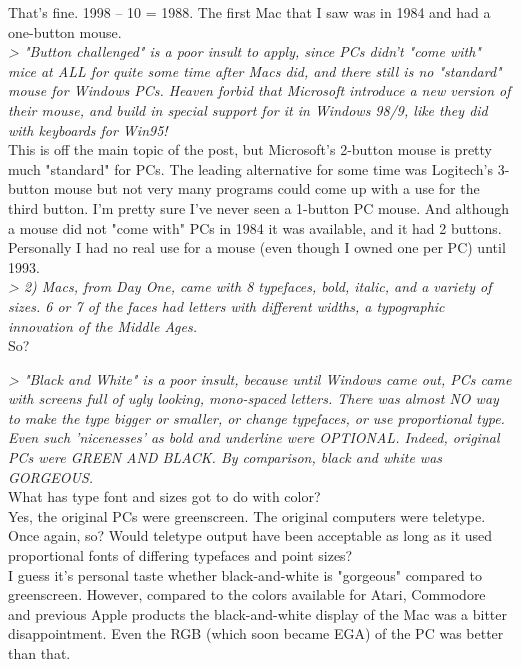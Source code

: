 \documentclass[11pt,twoside,a4paper]{article}
\begin{document}
\begin{multicols*}{2}
That's fine.  1998 -- 10 = 1988.  The first Mac that I saw was in 1984 and had a one-button mouse. ~\\

\emph{> "Button challenged" is a poor insult to apply, since PCs didn't "come with" mice at ALL for quite some time after Macs did, and there still is no "standard" mouse for Windows PCs. Heaven forbid that Microsoft introduce a new version of their mouse, and build in special support for it in Windows 98/9, like they did with keyboards for Win95!} ~\\

This is off the main topic of the post, but Microsoft's 2-button mouse is pretty much "standard" for PCs.  The leading alternative for some time was Logitech's 3-button mouse but not very many programs could come up with a use for the third button.  I'm pretty sure I've never seen a 1-button PC mouse.  And although a mouse did not "come with" PCs in 1984 it was available, and it had 2 buttons.  Personally I had no real use for a mouse (even though I owned one per PC) until 1993. ~\\

\emph{> 2) Macs, from Day One, came with 8 typefaces, bold, italic, and a variety of sizes. 6 or 7 of the faces had letters with different widths, a typographic innovation of the Middle Ages.} ~\\

So?

\emph{> "Black and White" is a poor insult, because until Windows came out, PCs came with screens full of ugly looking, mono-spaced letters. There was almost NO way to make the type bigger or smaller, or change typefaces, or use proportional type. Even such 'nicenesses' as bold and underline were OPTIONAL. Indeed, original PCs were GREEN AND BLACK. By comparison, black and white was GORGEOUS.} ~\\

What has type font and sizes got to do with color?   ~\\

Yes, the original PCs were greenscreen.  The original computers were teletype.  Once again, so?  Would teletype output have been acceptable as long as it used proportional fonts of differing typefaces and point sizes? ~\\

I guess it's personal taste whether black-and-white is "gorgeous" compared to greenscreen.  However, compared to the colors available for Atari, Commodore and previous Apple products the black-and-white display of the Mac was a bitter disappointment.  Even the RGB (which soon became EGA) of the PC was better than that. ~\\


\end{multicols*}
\end{document}
